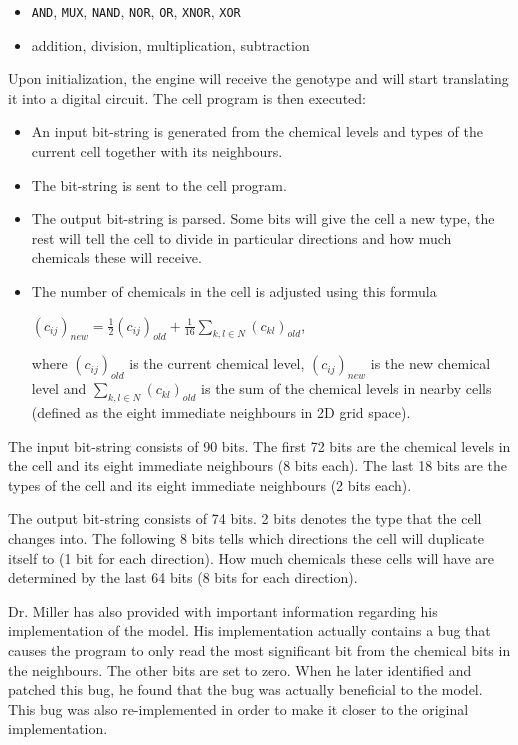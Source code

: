 \begin{itemize}
	\itemsep=0pt
	\item \texttt{AND}, \texttt{MUX}, \texttt{NAND}, \texttt{NOR}, \texttt{OR}, \texttt{XNOR}, \texttt{XOR}
	\item addition, division, multiplication, subtraction
\end{itemize}

Upon initialization, the engine will receive the genotype and will start translating it into a digital circuit. The cell program is then executed:

\begin{itemize}
	\itemsep=0pt
	\item An input bit-string is generated from the chemical levels and types of the current cell together with its neighbours.
	\item The bit-string is sent to the cell program.
	\item The output bit-string is parsed. Some bits will give the cell a new type, the rest will tell the cell to divide in particular directions and how much chemicals these will receive.
	\item The number of chemicals in the cell is adjusted using this formula

	$(c_{ij})_{new} = \frac{1}{2}(c_{ij})_{old} + \frac{1}{16}\sum_{k, l \in N} (c_{kl})_{old}$,

	where $(c_{ij})_{old}$ is the current chemical level, $(c_{ij})_{new}$ is the new chemical level and $\sum_{k, l \in N} (c_{kl})_{old}$ is the sum of the chemical levels in nearby cells (defined as the eight immediate neighbours in 2D grid space).
\end{itemize}

The input bit-string consists of 90 bits. The first 72 bits are the chemical levels in the cell and its eight immediate neighbours (8 bits each). The last 18 bits are the types of the cell and its eight immediate neighbours (2 bits each).

The output bit-string consists of 74 bits. 2 bits denotes the type that the cell changes into. The following 8 bits tells which directions the cell will duplicate itself to (1 bit for each direction). How much chemicals these cells will have are determined by the last 64 bits (8 bits for each direction).

Dr. Miller has also provided with important information regarding his implementation of the model. His implementation actually contains a bug that causes the program to only read the most significant bit from the chemical bits in the neighbours. The other bits are set to zero. When he later identified and patched this bug, he found that the bug was actually beneficial to the model. This bug was also re-implemented in order to make it closer to the original implementation.
